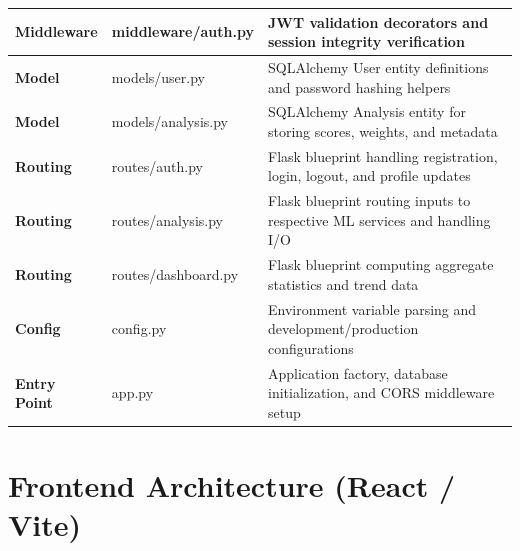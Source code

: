 \documentclass[12pt, a4paper]{report}
\begin{document}
\begin{table}[H]
\begin{tabularx}{\textwidth}{|l|l|X|}
\hline
\textbf{Middleware} & middleware/auth.py & JWT validation decorators and session integrity verification \\
\hline
\textbf{Model} & models/user.py & SQLAlchemy User entity definitions and password hashing helpers \\
\hline
\textbf{Model} & models/analysis.py & SQLAlchemy Analysis entity for storing scores, weights, and metadata \\
\hline
\textbf{Routing} & routes/auth.py & Flask blueprint handling registration, login, logout, and profile updates \\
\hline
\textbf{Routing} & routes/analysis.py & Flask blueprint routing inputs to respective ML services and handling I/O \\
\hline
\textbf{Routing} & routes/dashboard.py & Flask blueprint computing aggregate statistics and trend data \\
\hline
\textbf{Config} & config.py & Environment variable parsing and development/production configurations \\
\hline
\textbf{Entry Point} & app.py & Application factory, database initialization, and CORS middleware setup \\
\hline
\end{tabularx}
\end{table}

\section*{Frontend Architecture (React / Vite)}
\end{document}
